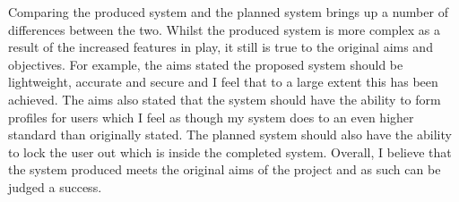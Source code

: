 \documentclass[10pt,a4paper]{report}
\begin{document}
Comparing the produced system and the planned system brings up a number of differences between the two. Whilst the produced system is more complex as a result of the increased features in play, it still is true to the original aims and objectives. For example, the aims stated the proposed system should be lightweight, accurate and secure and I feel that to a large extent this has been achieved. The aims also stated that the system should have the ability to form profiles for users which I feel as though my system does to an even higher standard than originally stated. The planned system should also have the ability to lock the user out which is inside the completed system. Overall, I believe that the system produced meets the original aims of the project and as such can be judged a success.



\end{document}

